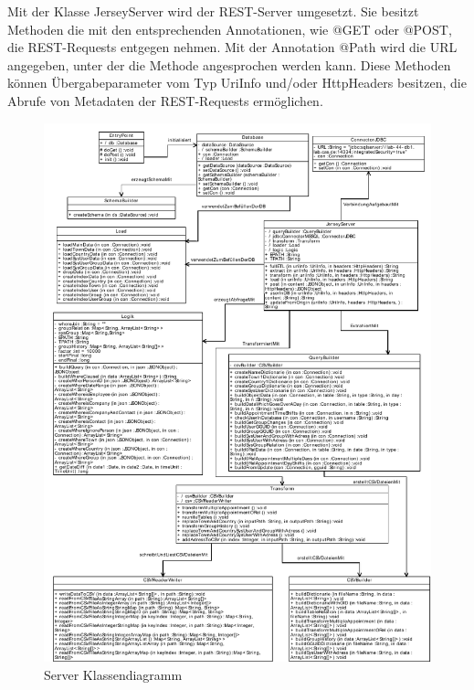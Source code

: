 Mit der Klasse JerseyServer wird der REST-Server umgesetzt. Sie besitzt Methoden die mit den entsprechenden Annotationen, wie @GET oder @POST, die REST-Requests entgegen nehmen. Mit der Annotation @Path wird die URL angegeben, unter der die Methode angesprochen werden kann. Diese Methoden können Übergabeparameter vom Typ UriInfo und/oder HttpHeaders besitzen, die Abrufe von Metadaten der REST-Requests ermöglichen. 

\begin{figure}[htbp]
\begin{center}
\includegraphics[width=1.0\textwidth]{pics/ServerKlassendiagramm.pdf}
\caption{Server Klassendiagramm}
\label{umsetzung_klassendiagramm_server}
\end{center}
\end{figure}

